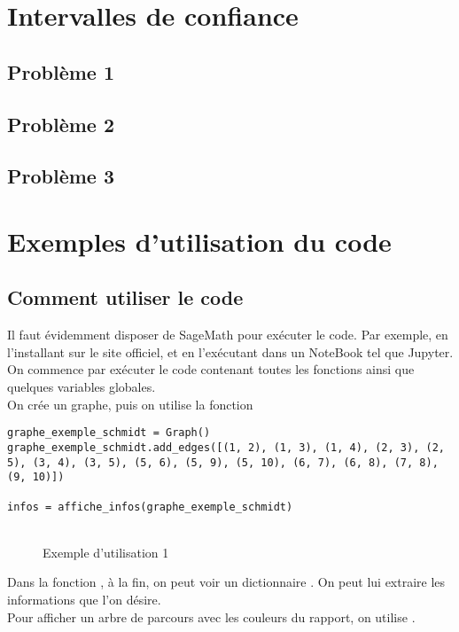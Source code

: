\documentclass{article}      %
\begin{document}
\section{Intervalles de confiance}
\subsection{Problème 1}
\subsection{Problème 2}
\subsection{Problème 3}



\section{Exemples d'utilisation du code}
\subsection{Comment utiliser le code}
Il faut évidemment disposer de SageMath pour exécuter le code.
Par exemple, en l'installant sur le site officiel, et en l'exécutant dans un NoteBook tel que Jupyter.
%
\\ On commence par exécuter le code contenant toutes les fonctions ainsi que quelques variables globales.
%
\\ On crée un graphe, puis on utilise la fonction 

\begin{lstlisting}[style=code-style]
graphe_exemple_schmidt = Graph()
graphe_exemple_schmidt.add_edges([(1, 2), (1, 3), (1, 4), (2, 3), (2, 5), (3, 4), (3, 5), (5, 6), (5, 9), (5, 10), (6, 7), (6, 8), (7, 8), (9, 10)])

infos = affiche_infos(graphe_exemple_schmidt)
\end{lstlisting}

\begin{figure}[H]
    \centering
    \\Exemple d'utilisation 1
\end{figure}

Dans la fonction , à la fin, on peut voir un dictionnaire .
On peut lui extraire les informations que l'on désire.
%
\\ Pour afficher un arbre de parcours avec les couleurs du rapport, on utilise .
\end{document}
